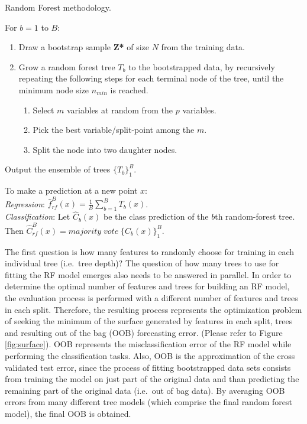 \documentclass[]{elsarticle} %
\begin{document}
\begin{algorithm}
    \caption{Random Forest methodology.}
    \begin{algorithmic}[1]
      \item For {$b=1$ to $B$:}
        \begin{enumerate}[label=(\alph*)]
          \item Draw a bootstrap sample \textbf{Z*} of size $N$ from the training data.
          \item Grow a random forest tree $T_b$ to the bootstrapped data, by recursively repeating the following steps for each terminal node of the tree, until the minimum node size $n_{min}$ is reached.
            \begin{enumerate}[label=\roman*]
              \item Select $m$ variables at random from the $p$ variables.
              \item Pick the best variable/split-point among the $m$.
              \item Split the node into two daughter nodes.
            \end{enumerate}
       \end{enumerate}
  \item Output the ensemble of trees $\{T_b\}^B_1$.
    \end{algorithmic}
    \vspace{0.2cm}
    To make a prediction at a new point $x$:\\[0.2cm]
    \textit {Regression}: $\widehat{f}^B_{rf}(x)= \frac{1}{B} \sum_{b=1}^B T_b (x)$.\\[0.2cm]
    \textit {Classification}: Let $\widehat{C}_b(x)$ be the class prediction of the $b$th random-forest tree. \\ 
    \phantom{Classification } Then $\widehat{C}^B_{rf}(x)=majority\;vote\; \{{C}_b(x)\}^B_1$.
    \label{alg:RF}
\end{algorithm}

The first question is how many features to randomly choose for training
in each individual tree (i.e.~tree depth)? The question of how many
trees to use for fitting the RF model emerges also needs to be answered
in parallel. In order to determine the optimal number of features and
trees for building an RF model, the evaluation process is performed with
a different number of features and trees in each split. Therefore, the
resulting process represents the optimization problem of seeking the
minimum of the surface generated by features in each split, trees and
resulting out of the bag (OOB) forecasting error. (Please refer to
Figure \ref{fig:surface}). OOB represents the misclassification error of
the RF model while performing the classification tasks. Also, OOB is the
approximation of the cross validated test error, since the process of
fitting bootstrapped data sets consists from training the model on just
part of the original data and than predicting the remaining part of the
original data (i.e.~out of bag data). By averaging OOB errors from many
different tree models (which comprise the final random forest model),
the final OOB is obtained.
\end{document}
